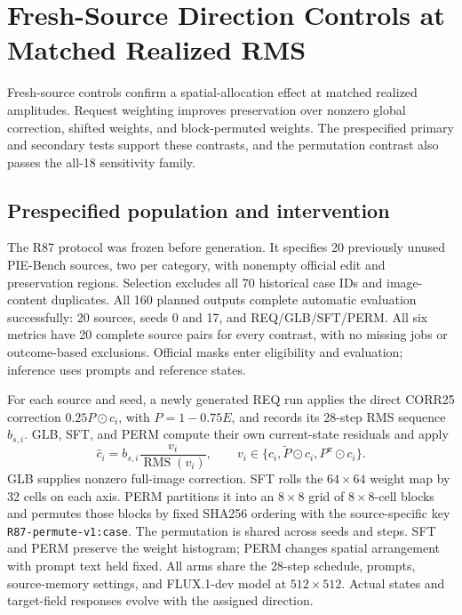 \section{Fresh-Source Direction Controls at Matched Realized RMS}
\label{sec:r87-fresh}
Fresh-source controls confirm a spatial-allocation effect at matched realized amplitudes. Request weighting improves preservation over nonzero global correction, shifted weights, and block-permuted weights. The prespecified primary and secondary tests support these contrasts, and the permutation contrast also passes the all-18 sensitivity family.

\subsection{Prespecified population and intervention}
The R87 protocol was frozen before generation. It specifies 20 previously unused PIE-Bench sources, two per category, with nonempty official edit and preservation regions. Selection excludes all 70 historical case IDs and image-content duplicates. All 160 planned outputs complete automatic evaluation successfully: 20 sources, seeds 0 and 17, and REQ/GLB/SFT/PERM. All six metrics have 20 complete source pairs for every contrast, with no missing jobs or outcome-based exclusions. Official masks enter eligibility and evaluation; inference uses prompts and reference states.

For each source and seed, a newly generated REQ run applies the direct CORR25 correction $0.25P\odot c_i$, with $P=1-0.75E$, and records its 28-step RMS sequence $b_{s,i}$. GLB, SFT, and PERM compute their own current-state residuals and apply
\begin{equation}
\widehat c_i=b_{s,i}\frac{v_i}{\operatorname{RMS}(v_i)},\qquad
v_i\in\{c_i,\widetilde P\odot c_i,P^\pi\odot c_i\}.
\label{eq:r87-matching}
\end{equation}
GLB supplies nonzero full-image correction. SFT rolls the $64\times64$ weight map by 32 cells on each axis. PERM partitions it into an $8\times8$ grid of $8\times8$-cell blocks and permutes those blocks by fixed SHA256 ordering with the source-specific key \texttt{R87-permute-v1:case}. The permutation is shared across seeds and steps. SFT and PERM preserve the weight histogram; PERM changes spatial arrangement with prompt text held fixed. All arms share the 28-step schedule, prompts, source-memory settings, and FLUX.1-dev model at $512\times512$. Actual states and target-field responses evolve with the assigned direction.

